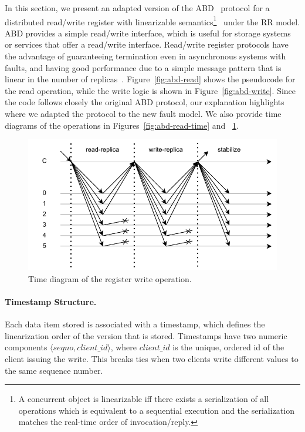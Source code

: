 In this section, we present an adapted version of the
ABD~\cite{abd} protocol for a distributed read/write register
with linearizable semantics\footnote{A concurrent object is
linearizable iff there exists a serialization of all operations
which is equivalent to a sequential execution and the
serialization matches the real-time order of
invocation/reply.}~\cite{linearizability} under the \ac{RR}
model. ABD provides a simple read/write interface, which is
useful for storage systems or services that offer a read/write
interface. Read/write register protocols have the advantage of
guaranteeing termination even in asynchronous systems with
faults, and having good performance due to a simple message
pattern that is linear in the number of
replicas~\cite{gryff:nsdi20}.
%
Figure~\ref{fig:abd-read} shows the pseudocode for the read
operation, while the write logic is shown in
Figure~\ref{fig:abd-write}. Since the code follows closely the
original ABD protocol, our explanation highlights where we
adapted the protocol to the new fault model. We also provide time
diagrams of the operations in Figures~\ref{fig:abd-read-time} and
~\ref{fig:abd-write-time}.

\begin{figure}[t]
    \centering
    \includegraphics[width=\linewidth]{img/abd_write}
    \caption{Time diagram of the register write operation.}\label{fig:abd-write-time}
\end{figure}

\paragraph{Timestamp Structure.}
Each data item stored is associated with a
timestamp, which defines the linearization order of the version
that is stored. Timestamps have two numeric components $\langle
seqno, client\_id \rangle$, where $client\_id$ is the
unique, ordered id of the client issuing the write.  This
breaks ties when two clients write different values to the same
sequence number.

